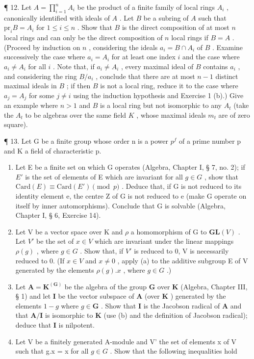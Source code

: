¶ 12. Let \(A = \prod_{i=1}^{n} A_i\) be the product of a finite family of local rings \(A_i\) , canonically identified with ideals of \(A\) . Let \(B\) be a subring of \(A\) such that \(\text{pr}_i B = A_i\) for \(1 \leqslant i \leqslant n\) . Show that \(B\) is the direct composition of at most \(n\) local rings and can only be the direct composition of \(n\) local rings if \(B = A\) . (Proceed by induction on \(n\) , considering the ideals \(a_i = B \cap A_i\) of \(B\) . Examine successively the case where \(a_i = A_i\) for at least one index \(i\) and the case where \(a_i \neq A_i\) for all \(i\) . Note that, if \(a_i \neq A_i\) , every maximal ideal of \(B\) contains \(a_i\) , and considering the ring \(B / a_i\) , conclude that there are at most \(n - 1\) distinct maximal ideals in \(B\) ; if then \(B\) is not a local ring, reduce it to the case where \(a_j = A_j\) for some \(j \neq i\) using the induction hypothesis and Exercise 1 (b).) Give an example where \(n > 1\) and \(B\) is a local ring but not isomorphic to any \(A_t\) (take the \(A_t\) to be algebras over the same field \(K\) , whose maximal ideals \(m_t\) are of zero square).

¶ 13. Let G be a finite group whose order n is a power \(p^{f}\) of a prime number p and K a field of characteristic p.

\begin{enumerate}
\def\labelenumi{(\alph{enumi})}
\item
  Let E be a finite set on which G operates (Algebra, Chapter I, § 7, no. 2); if \(E'\) is the set of elements of E which are invariant for all \(g \in G\) , show that \(\text{Card}(E) \equiv \text{Card}(E') \pmod{p}\) . Deduce that, if G is not reduced to its identity element e, the centre Z of G is not reduced to e (make G operate on itself by inner automorphisms). Conclude that G is solvable (Algebra, Chapter I, § 6, Exercise 14).
\item
  Let V be a vector space over K and \(\rho\) a homomorphism of G to \(\mathbf{GL}(V)\) . Let \(V'\) be the set of \(x \in V\) which are invariant under the linear mappings \(\rho(g)\) , where \(g \in G\) . Show that, if \(V'\) is reduced to 0, V is necessarily reduced to 0. (If \(x \in V\) and \(x \neq 0\) , apply (a) to the additive subgroup E of V generated by the elements \(\rho(g).x\) , where \(g \in G\) .)
\item
  Let \(\mathbf{A} = \mathbf{K}^{(\mathbf{G})}\) be the algebra of the group \(\mathbf{G}\) over \(\mathbf{K}\) (Algebra, Chapter III, § 1) and let \(\mathbf{I}\) be the vector subspace of \(\mathbf{A}\) (over \(\mathbf{K}\) ) generated by the elements \(1 - g\) where \(g \in \mathbf{G}\) . Show that \(\mathbf{I}\) is the Jacobson radical of \(\mathbf{A}\) and that \(\mathbf{A} / \mathbf{I}\) is isomorphic to \(\mathbf{K}\) (use (b) and the definition of Jacobson radical); deduce that \(\mathbf{I}\) is nilpotent.
\item
  Let V be a finitely generated A-module and V' the set of elements x of V such that g.x = x for all \(g \in G\) . Show that the following inequalities hold
\end{enumerate}


